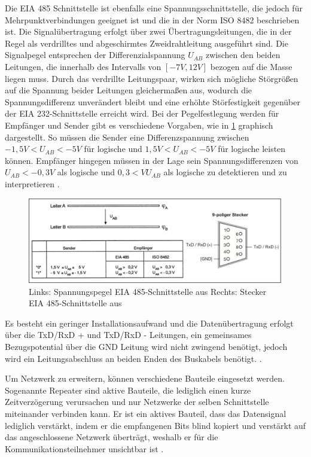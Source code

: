 Die EIA 485 Schnittstelle ist ebenfalls eine Spannungsschnittstelle, die jedoch für Mehrpunktverbindungen geeignet ist und die in der Norm ISO
8482 beschrieben ist. Die Signalübertragung erfolgt über zwei Übertragungsleitungen, die in der Regel als verdrilltes und abgeschirmtes Zweidrahtleitung ausgeführt sind. Die Signalpegel entsprechen der Differenzialspannung $U_{AB}$ zwischen den beiden Leitungen, die innerhalb des Intervalls von $[-7V,12V]$ bezogen auf die Masse liegen muss. Durch das verdrillte Leitungspaar, wirken sich mögliche Störgrößen auf die Spannung beider Leitungen gleichermaßen aus, wodurch die Spannungsdifferenz unverändert bleibt und eine erhöhte Störfestigkeit gegenüber der EIA 232-Schnittstelle erreicht wird.
Bei der Pegelfestlegung werden für Empfänger und Sender gibt es verschiedene Vorgaben, wie in \ref{fig:rs485} graphisch dargestellt. So müssen die Sender eine Differenzspannung zwischen $-1,5V<U_{AB}<-5V$ für logische \Gob und $1,5V<U_{AB}<-5V$ für logische \Gob leisten können. Empfänger hingegen müssen in der Lage sein Spannungsdifferenzen von $U_{AB}<-0,3V$ als logische \Gob und $0,3<VU_{AB}$ als logische \Gob zu detektieren und zu interpretieren \cite[S.~59ff.]{schn06}.

\begin{figure}
\centering
\includegraphics[width=\textwidth]{abbildungen/20160314_rs485}
\caption[Spannungspegel und Stecker der EIA 485-Schnittstelle]{Links: Spannungspegel EIA 485-Schnittstelle aus \cite[S.~60]{schn06} \newline Rechts: Stecker EIA 485-Schnittstelle aus \cite[S.~19]{sch08}}
\label{fig:rs485}
\end{figure}

Es besteht ein geringer Installationsaufwand und die Datenübertragung erfolgt über die TxD/RxD + und TxD/RxD - Leitungen, ein gemeinsames Bezugspotential über die GND Leitung wird nicht zwingend benötigt, jedoch wird ein Leitungsabschluss an beiden Enden des Buskabels benötigt.  \cite[S.~19f.]{sch08}.


Um Netzwerk zu erweitern, können verschiedene Bauteile eingesetzt werden. Sogenannte Repeater sind aktive Bauteile, die lediglich einen kurze Zeitverzögerung verursachen und nur Netzwerke der selben Schnittstelle miteinander verbinden kann. Er ist ein aktives Bauteil, dass das Datensignal lediglich verstärkt, indem er die empfangenen Bits blind kopiert und verstärkt auf das angeschlossene Netzwerk überträgt, weshalb er für die Kommunikationsteilnehmer unsichtbar ist \cite[S.~79f.]{schn06}.

